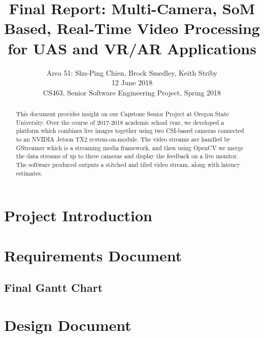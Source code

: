 \documentclass[letterpaper,10pt,serif,draftclsnofoot,onecolumn,compsoc,titlepage]{IEEEtran}
\title{Final Report: Multi-Camera, SoM Based, Real-Time Video Processing for UAS and VR/AR Applications}
\author{Area 51: Shu-Ping Chien, Brock Smedley, Keith Striby \\ 12 June 2018 \\ CS463, Senior Software Engineering Project, Spring 2018}
\begin{document}
\begin{titlepage}
\maketitle

\begin{abstract}

This document provides insight on our Capstone Senior Project at Oregon State University. 
Over the course of 2017-2018 academic school year, we developed a platform which combines 
live images together using two CSI-based cameras connected to an NVIDIA Jetson TX2 
system-on-module. The video streams are handled by GStreamer which is a streaming media 
framework, and then using OpenCV we merge the data streams of up to three cameras and 
display the feedback on a live monitor. The software produced outputs a stitched and 
tiled video stream, along with latency estimates. \\

\thispagestyle{empty}
\end{abstract}
\end{titlepage}

\newpage
\tableofcontents

\newpage

\section{Project Introduction}

	

\newpage

\section{Requirements Document}

	
\newpage

\subsection{Final Gantt Chart}

	

\newpage

\section{Design Document}

	
\end{document}
